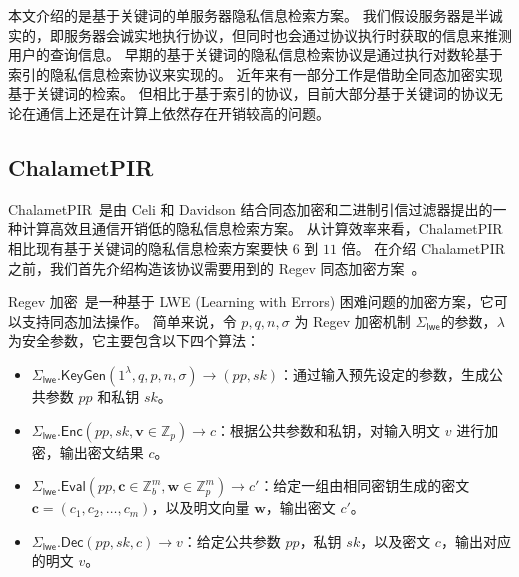 本文介绍的是基于关键词的单服务器隐私信息检索方案。
我们假设服务器是半诚实的，即服务器会诚实地执行协议，但同时也会通过协议执行时获取的信息来推测用户的查询信息。
早期的基于关键词的隐私信息检索协议是通过执行对数轮基于索引的隐私信息检索协议来实现的。
近年来有一部分工作是借助全同态加密实现基于关键词的检索。
但相比于基于索引的协议，目前大部分基于关键词的协议无论在通信上还是在计算上依然存在开销较高的问题。

\subsection{ChalametPIR}

ChalametPIR~\cite{celi2024call}是由 Celi 和 Davidson 结合同态加密和二进制引信过滤器提出的一种计算高效且通信开销低的隐私信息检索方案。
从计算效率来看，ChalametPIR 相比现有基于关键词的隐私信息检索方案要快 $6$ 到 $11$ 倍。
在介绍 ChalametPIR 之前，我们首先介绍构造该协议需要用到的 Regev 同态加密方案~\cite{regev2009lattices}。

Regev 加密~\cite{regev2009lattices}是一种基于 LWE (Learning with Errors) 困难问题的加密方案，它可以支持同态加法操作。
简单来说，令 $p, q, n, \sigma$ 为 Regev 加密机制 $\Sigma_{\mathsf{lwe}}$的参数，$\lambda$ 为安全参数，它主要包含以下四个算法：
\begin{itemize}
  \item $\Sigma_{\mathsf{lwe}}.\mathsf{KeyGen}(1^\lambda, q, p, n, \sigma) \to (pp, sk)$：通过输入预先设定的参数，生成公共参数 $pp$ 和私钥 $sk$。
  \item $\Sigma_{\mathsf{lwe}}.\mathsf{Enc}(pp, sk, \mathbf{v}\in \mathbb{Z}_p) \to c$：根据公共参数和私钥，对输入明文 $v$ 进行加密，输出密文结果 $c$。
  \item $\Sigma_{\mathsf{lwe}}.\mathsf{Eval}(pp, \mathbf{c} \in \mathbb{Z}_b^m, \mathbf{w} \in \mathbb{Z}_p^m)\to c'$：给定一组由相同密钥生成的密文 $\mathbf{c} = (c_1, c_2, \dots, c_m)$，以及明文向量 $\mathbf{w}$，输出密文 $c'$。
  \item $\Sigma_{\mathsf{lwe}}.\mathsf{Dec}(pp, sk, c) \to v$：给定公共参数 $pp$，私钥 $sk$，以及密文 $c$，输出对应的明文 $v$。
\end{itemize}

